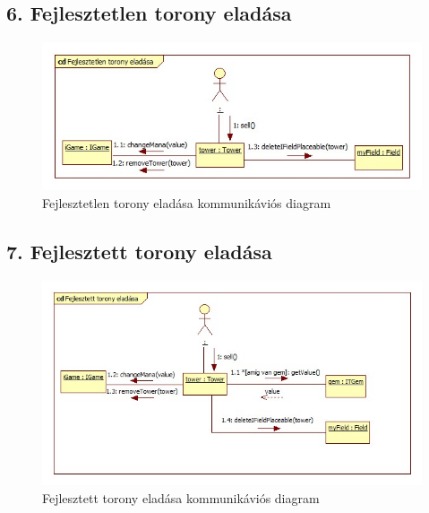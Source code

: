 \subsection{6. Fejlesztetlen torony eladása}
\begin{figure}[H]
\begin{center}
\includegraphics[width=17cm]{chapters/chapter05/images/cd_Fejlesztetlen_torony_eladasa.jpg}
\caption{Fejlesztetlen torony eladása kommunikáviós diagram}
\label{fig:cd_Fejlesztetlen_torony_eladasa}
\end{center}
\end{figure}

\subsection{7. Fejlesztett torony eladása}
\begin{figure}[H]
\begin{center}
\includegraphics[width=17cm]{chapters/chapter05/images/cd_Fejlesztett_torony_eladasa.jpg}
\caption{Fejlesztett torony eladása kommunikáviós diagram}
\label{fig:cd_Fejlesztett_torony_eladasa}
\end{center}
\end{figure}

